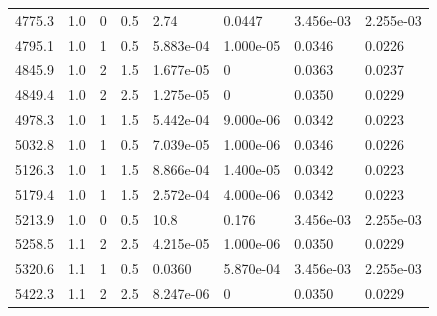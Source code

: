 \documentclass[preview]{standalone}
\begin{document}
{{{\begin{tabular}{L{1.2cm}C{1.2cm} C{0.3cm}C{0.5cm} C{1.4cm}C{1.4cm} C{1.4cm}C{1.4cm}}
  4775.3  &   1.0  & 0     & 0.5 &  2.74  & 0.0447  & 3.456e-03 &  2.255e-03   \\ 
  4795.1  &   1.0  & 1     & 0.5 &  5.883e-04  & 1.000e-05  & 0.0346 &  0.0226   \\ 
  4845.9  &   1.0  & 2     & 1.5 &  1.677e-05  & 0  & 0.0363 &  0.0237   \\ 
  4849.4  &   1.0  & 2     & 2.5 &  1.275e-05  & 0  & 0.0350 &  0.0229   \\ 
  4978.3  &   1.0  & 1     & 1.5 &  5.442e-04  & 9.000e-06  & 0.0342 &  0.0223   \\ 
  5032.8  &   1.0  & 1     & 0.5 &  7.039e-05  & 1.000e-06  & 0.0346 &  0.0226   \\ 
  5126.3  &   1.0  & 1     & 1.5 &  8.866e-04  & 1.400e-05  & 0.0342 &  0.0223   \\ 
  5179.4  &   1.0  & 1     & 1.5 &  2.572e-04  & 4.000e-06  & 0.0342 &  0.0223   \\ 
  5213.9  &   1.0  & 0     & 0.5 &  10.8  & 0.176  & 3.456e-03 &  2.255e-03   \\ 
  5258.5  &   1.1  & 2     & 2.5 &  4.215e-05  & 1.000e-06  & 0.0350 &  0.0229   \\ 
  5320.6  &   1.1  & 1     & 0.5 &  0.0360  & 5.870e-04  & 3.456e-03 &  2.255e-03   \\ 
  5422.3  &   1.1  & 2     & 2.5 &  8.247e-06  & 0  & 0.0350 &  0.0229   \\ 
\hline 
\end{tabular} 

}}}
\end{document}
